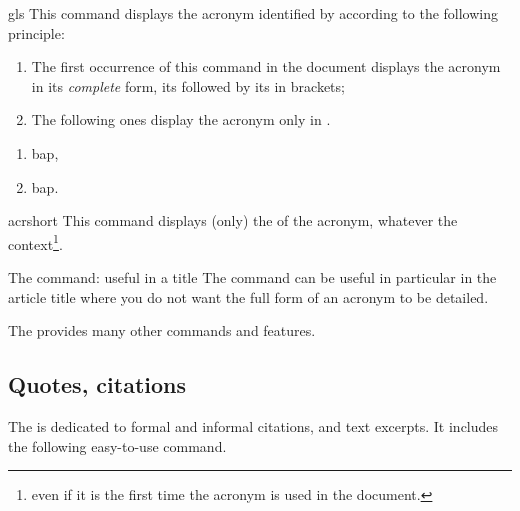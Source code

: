 \documentclass[english,nolocaltoc]{nwejmart}
\newtheorem[style=definition]{fact}
\newtheorem[title=experience]{experience}
\newtheorem[title-plural=rings]{ring}
\newtheorem[title=ideal,title-plural=ideals]{ideal}
\begin{document}
\begin{docCommand}{gls}{}
  This command displays the acronym identified by 
  according to the following principle:
  \begin{enumerate}
  \item The first occurrence of this command in the document displays
    the acronym in its \emph{complete} form, \ie*{} its  followed by its  in brackets;
  \item The following ones  display the acronym only in .
  \end{enumerate}
\end{docCommand}

\begin{preamblecode}[listing options={alsolanguage={[glossaries]TeX}}]
\end{preamblecode}
\begin{bodycode}[listing and text,listing options={alsolanguage={[glossaries]TeX}}]
\begin{enumerate}
\item \gls{bap},
\item \gls{bap}.
\end{enumerate}
\end{bodycode}

\begin{docCommand}{acrshort}{}
  This command displays  (only)  the  of the acronym,
  whatever the  context\footnote{\Ie*{} even if it is the first time the acronym is used in the  document.}.
\end{docCommand}

\begin{dbremark}{The  command: useful in a title}{}
  The  command can be useful in particular in the
  article title where you do not want the full form of an acronym to
  be detailed.
\end{dbremark}

The  provides many other commands and
features\autocite[For more  details, see for instance][]{Bitouze7}.

\subsection{Quotes, citations}
\label{sec-guillemets-citations}

The  is dedicated to formal and informal citations,
and text excerpts. It includes the following easy-to-use 
command.
\end{document}
